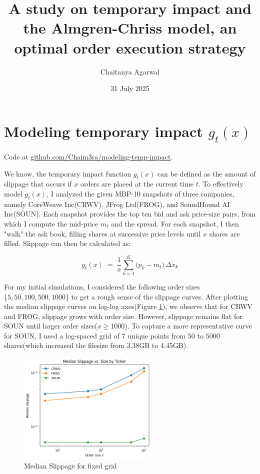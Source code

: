 \documentclass[12pt, letterpaper]{article}
\title{A study on temporary impact and the Almgren-Chriss model, an optimal order execution strategy}
\author{Chaitanya Agarwal}
\date{31 July 2025}
\begin{document}
\maketitle


\section{Modeling temporary impact $g_t(x)$}

\vspace{-0.3em}

Code at 
\href{https://github.com/Chaim3ra/modeling-temp-impact}{github.com/Chaim3ra/modeling-temp-impact}.


\vspace{1em}

We know, the temporary impact function $g_t(x)$ can be defined as the amount of slippage that occurs if $x$ orders are placed at the current time $t$. To effectively model $g_t(x)$, I analyzed the given MBP-10 snapshots of three companies, namely CoreWeave Inc(CRWV), JFrog Ltd(FROG), and SoundHound AI Inc(SOUN). Each snapshot provides the top ten bid and ask price-size pairs, from which I compute the mid-price $m_t$ and the spread. For each snapshot, I then "walk" the ask book, filling shares at successive price levels until \(x\) shares are filled. Slippage can then be calculated as:

\[g_t(x) \;=\;\frac{1}{x}\sum_{k=1}^{K}\bigl(p_k - m_t\bigr)\,\Delta x_k\]



For my initial simulations, I considered the following order sizes \newline $\{5, 50, 100, 500, 1000\}$ to get a rough sense of the slippage curves. After plotting the median slippage curves on log-log axes(Figure \ref{fig:slippage_fixed_grid}), we observe that for CRWV and FROG, slippage grows with order size. 
However, slippage remains flat for SOUN until larger order sizes($x  \geq 1000$). To capture a more representative curve for SOUN, I used a log-spaced grid of 7 unique points from 50 to 5000 shares(which increased the filesize from 3.38GB to 4.45GB).



\begin{figure}[h!] %
    \centering
    \includegraphics[width=0.6\textwidth]{res/images/median_slippage_small_grid.png} %
    \caption{Median Slippage for fixed grid}
    \label{fig:slippage_fixed_grid}
\end{figure}
\end{document}
